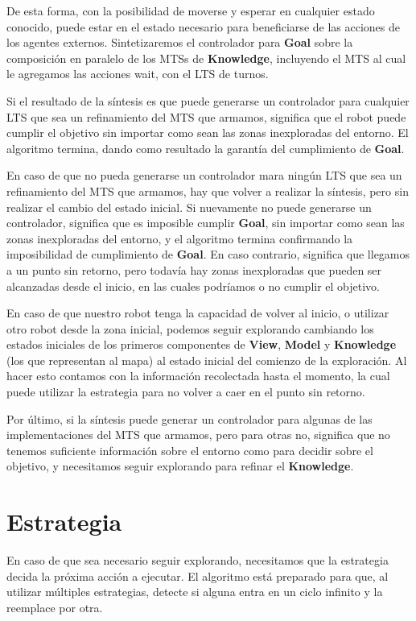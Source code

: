 De esta forma, con la posibilidad de moverse y esperar en cualquier estado conocido, puede estar en el estado necesario para beneficiarse de las acciones de 
los agentes externos. Sintetizaremos el controlador para \textbf{Goal} sobre la composición en paralelo de los MTSs de \textbf{Knowledge}, incluyendo el MTS al 
cual le agregamos las acciones wait, con el LTS de turnos.

Si el resultado de la síntesis es que puede generarse un controlador para cualquier LTS que sea un refinamiento del MTS que armamos, significa que el robot 
puede cumplir el objetivo sin importar como sean las zonas inexploradas del entorno. El algoritmo termina, dando como resultado la garantía del cumplimiento 
de \textbf{Goal}.

En caso de que no pueda generarse un controlador mara ningún LTS que sea un refinamiento del MTS que armamos, hay que volver a realizar la síntesis, pero sin 
realizar el cambio del estado inicial. Si nuevamente no puede generarse un controlador, significa que es imposible cumplir \textbf{Goal}, sin importar como sean 
las zonas inexploradas del entorno, y el algoritmo termina confirmando la imposibilidad de cumplimiento de \textbf{Goal}. En caso contrario, significa que 
llegamos a un punto sin retorno, pero todavía hay zonas inexploradas que pueden ser alcanzadas desde el inicio, en las cuales podríamos o no cumplir el objetivo. 

En caso de que nuestro robot tenga la capacidad de volver al inicio, o utilizar otro robot desde la zona inicial, podemos seguir explorando cambiando los 
estados iniciales de los primeros componentes de \textbf{View}, \textbf{Model} y \textbf{Knowledge} (los que representan al mapa) al estado inicial del comienzo 
de la exploración. Al hacer esto contamos con la información recolectada hasta el momento, la cual puede utilizar la estrategia para no volver a caer en el 
punto sin retorno.

Por último, si la síntesis puede generar un controlador para algunas de las implementaciones del MTS que armamos, pero para otras no, significa que no tenemos 
suficiente información sobre el entorno como para decidir sobre el objetivo, y necesitamos seguir explorando para refinar el \textbf{Knowledge}.

\section{Estrategia}

En caso de que sea necesario seguir explorando, necesitamos que la estrategia decida la próxima acción a ejecutar. El algoritmo está preparado para que, 
al utilizar múltiples estrategias, detecte si alguna entra en un ciclo infinito y la reemplace por otra.

